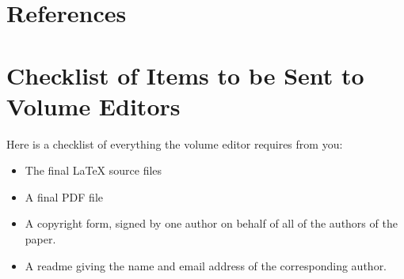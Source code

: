 \documentclass[runningheads,a4paper]{llncs}
\begin{document}
\section{References}\label{references}


\section{Checklist of Items to be Sent to Volume Editors}
Here is a checklist of everything the volume editor requires from you:

\begin{itemize}
\settowidth{\leftmargin}{{\Large$\square$}}\advance\leftmargin{}
\itemsep8pt\relax
\renewcommand\labelitemi{{\lower1.5pt\hbox{\Large$\square$}}}

\item The final \LaTeX{} source files
\item A final PDF file
\item A copyright form, signed by one author on behalf of all of the
authors of the paper.
\item A readme giving the name and email address of the
corresponding author.
\end{itemize}
\end{document}
